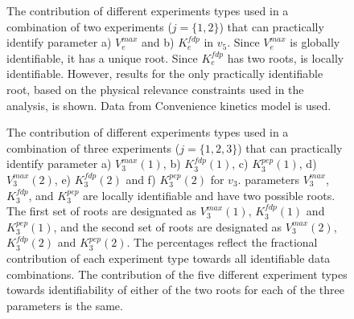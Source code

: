 \documentclass[10pt]{article}
\begin{document}
\begin{figure}[!tbhp]
	\caption{The contribution of different experiments types used in a combination of two experiments ($j = \{1, 2\}$) that can practically identify parameter a) $V_e^{max}$ and b) $K_e^{fdp}$ in $v_5$. Since $V_e^{max}$ is globally identifiable, it has a unique root. Since $K_e^{fdp}$ has two roots, is locally identifiable. However, results for the only practically identifiable root, based on the physical relevance constraints used in the analysis, is shown. Data from Convenience kinetics model is used.}%
\end{figure}		

\begin{figure}[!tbhp]
	\caption{The contribution of different experiments types used in a combination of three experiments ($j = \{1, 2, 3\}$) that can practically identify parameter a) $V_3^{max}(1)$, b) $K_3^{fdp}(1)$, c) $K_3^{pep}(1)$, d) $V_3^{max}(2)$, e) $K_3^{fdp}(2)$ and f) $K_3^{pep}(2)$ for $v_3$. parameters $V_3^{max}$, $K_3^{fdp}$, and $K_3^{pep}$ are locally identifiable and have two possible roots. The first set of roots are designated as $V_3^{max}(1)$, $K_3^{fdp}(1)$ and $K_3^{pep}(1)$, and the second set of roots are designated as $V_3^{max}(2)$, $K_3^{fdp}(2)$ and $K_3^{pep}(2)$. The percentages reflect the fractional contribution of each experiment type towards all identifiable data combinations. The contribution of the five different experiment types towards identifiability of either of the two roots for each of the three parameters is the same.}\label{fig:v3_exp_info}
\end{figure} 	
\end{document}
